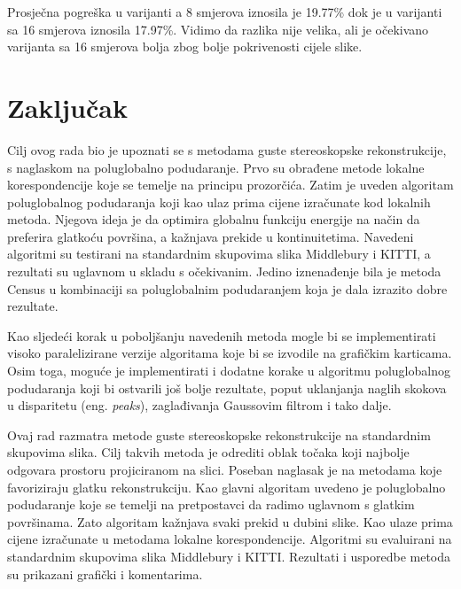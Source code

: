 \documentclass[utf8, zavrsni, numeric]{fer}
\begin{document}
Prosječna pogreška u varijanti a 8 smjerova iznosila je 19.77\% dok je u varijanti sa 16
smjerova iznosila 17.97\%. Vidimo da razlika nije velika, ali je očekivano varijanta sa 16 smjerova bolja zbog bolje pokrivenosti cijele slike.

\chapter{Zaključak}
Cilj ovog rada bio je upoznati se s metodama guste stereoskopske rekonstrukcije, s naglaskom
na poluglobalno podudaranje. Prvo su obrađene metode lokalne korespondencije koje se temelje
na principu prozorčića. Zatim je uveden algoritam poluglobalnog podudaranja koji kao ulaz
prima cijene izračunate kod lokalnih metoda. Njegova ideja je da optimira globalnu funkciju energije na način da preferira glatkoću površina, a kažnjava prekide u kontinuitetima.
Navedeni algoritmi su testirani na standardnim skupovima slika Middlebury i KITTI, a rezultati
su uglavnom u skladu s očekivanim. Jedino iznenađenje bila je metoda Census u kombinaciji sa poluglobalnim podudaranjem koja je dala izrazito dobre rezultate.

Kao sljedeći korak u poboljšanju navedenih metoda mogle bi se implementirati visoko paralelizirane verzije algoritama
koje bi se izvodile na grafičkim karticama. Osim toga, moguće je implementirati i dodatne
korake u algoritmu poluglobalnog podudaranja koji bi ostvarili još bolje rezultate, poput
uklanjanja naglih skokova u disparitetu (eng. {\sl peaks}), zaglađivanja Gaussovim filtrom i tako dalje.




\begin{sazetak}
  Ovaj rad razmatra metode guste stereoskopske rekonstrukcije na standardnim skupovima slika.
  Cilj takvih metoda je odrediti oblak točaka koji najbolje odgovara prostoru projiciranom
  na slici.
  Poseban naglasak je na metodama koje favoriziraju glatku rekonstrukciju. Kao glavni
  algoritam uvedeno je poluglobalno podudaranje koje se temelji na pretpostavci da radimo
  uglavnom s glatkim površinama. Zato algoritam kažnjava svaki prekid u dubini slike. Kao
  ulaze prima cijene izračunate u metodama lokalne korespondencije. Algoritmi su
  evaluirani na standardnim skupovima slika Middlebury i KITTI. Rezultati i usporedbe metoda su prikazani
  grafički i komentarima.

\end{sazetak}
\end{document}
